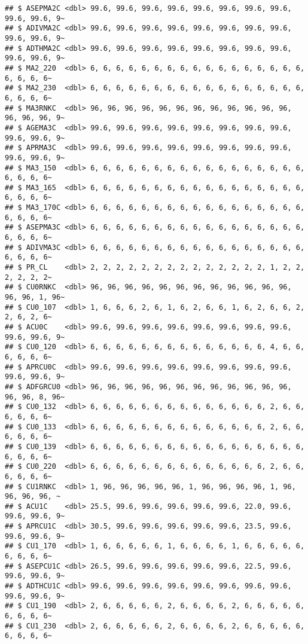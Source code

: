 \documentclass[
]{article}
\begin{document}
\begin{verbatim}
## $ ASEPMA2C <dbl> 99.6, 99.6, 99.6, 99.6, 99.6, 99.6, 99.6, 99.6, 99.6, 99.6, 9~
## $ ADIVMA2C <dbl> 99.6, 99.6, 99.6, 99.6, 99.6, 99.6, 99.6, 99.6, 99.6, 99.6, 9~
## $ ADTHMA2C <dbl> 99.6, 99.6, 99.6, 99.6, 99.6, 99.6, 99.6, 99.6, 99.6, 99.6, 9~
## $ MA2_220  <dbl> 6, 6, 6, 6, 6, 6, 6, 6, 6, 6, 6, 6, 6, 6, 6, 6, 6, 6, 6, 6, 6~
## $ MA2_230  <dbl> 6, 6, 6, 6, 6, 6, 6, 6, 6, 6, 6, 6, 6, 6, 6, 6, 6, 6, 6, 6, 6~
## $ MA3RNKC  <dbl> 96, 96, 96, 96, 96, 96, 96, 96, 96, 96, 96, 96, 96, 96, 96, 9~
## $ AGEMA3C  <dbl> 99.6, 99.6, 99.6, 99.6, 99.6, 99.6, 99.6, 99.6, 99.6, 99.6, 9~
## $ APRMA3C  <dbl> 99.6, 99.6, 99.6, 99.6, 99.6, 99.6, 99.6, 99.6, 99.6, 99.6, 9~
## $ MA3_150  <dbl> 6, 6, 6, 6, 6, 6, 6, 6, 6, 6, 6, 6, 6, 6, 6, 6, 6, 6, 6, 6, 6~
## $ MA3_165  <dbl> 6, 6, 6, 6, 6, 6, 6, 6, 6, 6, 6, 6, 6, 6, 6, 6, 6, 6, 6, 6, 6~
## $ MA3_170C <dbl> 6, 6, 6, 6, 6, 6, 6, 6, 6, 6, 6, 6, 6, 6, 6, 6, 6, 6, 6, 6, 6~
## $ ASEPMA3C <dbl> 6, 6, 6, 6, 6, 6, 6, 6, 6, 6, 6, 6, 6, 6, 6, 6, 6, 6, 6, 6, 6~
## $ ADIVMA3C <dbl> 6, 6, 6, 6, 6, 6, 6, 6, 6, 6, 6, 6, 6, 6, 6, 6, 6, 6, 6, 6, 6~
## $ PR_CL    <dbl> 2, 2, 2, 2, 2, 2, 2, 2, 2, 2, 2, 2, 2, 2, 1, 2, 2, 2, 2, 2, 2~
## $ CU0RNKC  <dbl> 96, 96, 96, 96, 96, 96, 96, 96, 96, 96, 96, 96, 96, 96, 1, 96~
## $ CU0_107  <dbl> 1, 6, 6, 6, 2, 6, 1, 6, 2, 6, 6, 1, 6, 2, 6, 6, 2, 2, 6, 2, 6~
## $ ACU0C    <dbl> 99.6, 99.6, 99.6, 99.6, 99.6, 99.6, 99.6, 99.6, 99.6, 99.6, 9~
## $ CU0_120  <dbl> 6, 6, 6, 6, 6, 6, 6, 6, 6, 6, 6, 6, 6, 6, 4, 6, 6, 6, 6, 6, 6~
## $ APRCU0C  <dbl> 99.6, 99.6, 99.6, 99.6, 99.6, 99.6, 99.6, 99.6, 99.6, 99.6, 9~
## $ ADFGRCU0 <dbl> 96, 96, 96, 96, 96, 96, 96, 96, 96, 96, 96, 96, 96, 96, 8, 96~
## $ CU0_132  <dbl> 6, 6, 6, 6, 6, 6, 6, 6, 6, 6, 6, 6, 6, 6, 2, 6, 6, 6, 6, 6, 6~
## $ CU0_133  <dbl> 6, 6, 6, 6, 6, 6, 6, 6, 6, 6, 6, 6, 6, 6, 2, 6, 6, 6, 6, 6, 6~
## $ CU0_139  <dbl> 6, 6, 6, 6, 6, 6, 6, 6, 6, 6, 6, 6, 6, 6, 6, 6, 6, 6, 6, 6, 6~
## $ CU0_220  <dbl> 6, 6, 6, 6, 6, 6, 6, 6, 6, 6, 6, 6, 6, 6, 2, 6, 6, 6, 6, 6, 6~
## $ CU1RNKC  <dbl> 1, 96, 96, 96, 96, 96, 1, 96, 96, 96, 96, 1, 96, 96, 96, 96, ~
## $ ACU1C    <dbl> 25.5, 99.6, 99.6, 99.6, 99.6, 99.6, 22.0, 99.6, 99.6, 99.6, 9~
## $ APRCU1C  <dbl> 30.5, 99.6, 99.6, 99.6, 99.6, 99.6, 23.5, 99.6, 99.6, 99.6, 9~
## $ CU1_170  <dbl> 1, 6, 6, 6, 6, 6, 1, 6, 6, 6, 6, 1, 6, 6, 6, 6, 6, 6, 6, 6, 6~
## $ ASEPCU1C <dbl> 26.5, 99.6, 99.6, 99.6, 99.6, 99.6, 22.5, 99.6, 99.6, 99.6, 9~
## $ ADTHCU1C <dbl> 99.6, 99.6, 99.6, 99.6, 99.6, 99.6, 99.6, 99.6, 99.6, 99.6, 9~
## $ CU1_190  <dbl> 2, 6, 6, 6, 6, 6, 2, 6, 6, 6, 6, 2, 6, 6, 6, 6, 6, 6, 6, 6, 6~
## $ CU1_230  <dbl> 2, 6, 6, 6, 6, 6, 2, 6, 6, 6, 6, 2, 6, 6, 6, 6, 6, 6, 6, 6, 6~

\end{verbatim}
\end{document}
